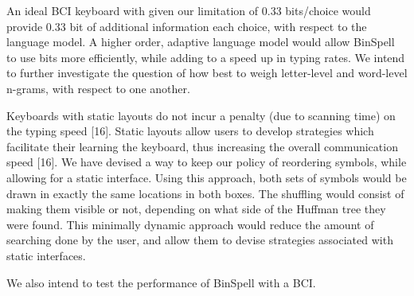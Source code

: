 \documentclass[12pt,titlepage]{article}
\begin{document}
An ideal BCI keyboard with given our limitation of 0.33 bits/choice would provide 0.33 bit of 
additional information each choice, with respect to the language model.  A higher order, adaptive 
language model would allow BinSpell to use bits more efficiently, while adding to a speed up in typing 
rates.  We intend to further investigate the question of how best to weigh letter-level and word-level n-grams, with respect to one another. 

Keyboards with static layouts do not incur a penalty (due to scanning time) on the typing speed [16]. 
Static layouts allow users to develop strategies which facilitate their learning the keyboard, thus 
increasing the overall communication speed [16].  We have devised a way to keep our policy of 
reordering symbols, while allowing for a static interface.  Using this approach, both sets of symbols 
would be drawn in exactly the same locations in both boxes.  The  shuffling would consist of making 
them visible or not, depending on what side of the Huffman tree they were found.  This minimally 
dynamic approach would reduce the amount of searching done by the user, and allow them to devise 
strategies associated with static interfaces. 

We also intend to test the performance of BinSpell with a BCI.



\end{document}
